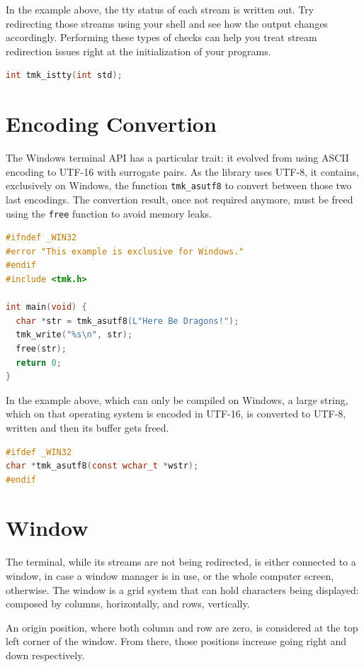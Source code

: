 \documentclass{report}
\begin{document}
In the example above, the tty status of each stream is written out. Try redirecting those streams using your shell and see how the output changes accordingly. Performing these types of checks can help you treat stream redirection issues right at the initialization of your programs.
\begin{lstlisting}[language=c,caption=the declaration of the \texttt{tmk\_istty} function.]
int tmk_istty(int std);
\end{lstlisting}
\section{Encoding Convertion}
The Windows terminal API has a particular trait: it evolved from using ASCII encoding to UTF-16 with surrogate pairs. As the library uses UTF-8, it contains, exclusively on Windows, the function \texttt{tmk\_asutf8} to convert between those two last encodings. The convertion result, once not required anymore, must be freed using the \texttt{free} function to avoid memory leaks.
\begin{lstlisting}[language=c,caption=an example that converts an UTF-16 encoded string to UTF-8.]
#ifndef _WIN32
#error "This example is exclusive for Windows."
#endif
#include <tmk.h>

int main(void) {
  char *str = tmk_asutf8(L"Here Be Dragons!");
  tmk_write("%s\n", str);
  free(str);
  return 0;
}
\end{lstlisting}

In the example above, which can only be compiled on Windows, a large string, which on that operating system is encoded in UTF-16, is converted to UTF-8, written and then its buffer gets freed.
\begin{lstlisting}[language=c,caption=the declaration of the \texttt{tmk\_asutf8} function.]
#ifdef _WIN32
char *tmk_asutf8(const wchar_t *wstr);
#endif
\end{lstlisting}
\section{Window}
The terminal, while its streams are not being redirected, is either connected to a window, in case a window manager is in use, or the whole computer screen, otherwise. The window is a grid system that can hold characters being displayed: composed by columns, horizontally, and rows, vertically.

An origin position, where both column and row are zero, is considered at the top left corner of the window. From there, those positions increase going right and down respectively.
\end{document}
